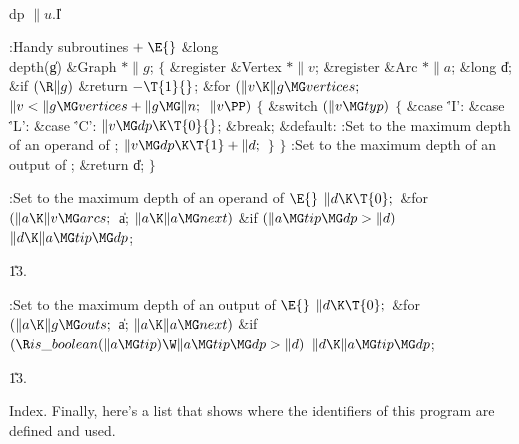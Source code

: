 \Y\B\4\D\\{dp}\5
$\|u.{}$\|I\par
\Y\B\4:Handy subroutines\X${}\mathrel+\E{}$\6
\1\1\&{long} \\{depth}(\|g)\6
\&{Graph} ${}{*}\|g{}$;\2\2\6
${}\{{}$\5
\1\&{register} \&{Vertex} ${}{*}\|v{}$;\6
\&{register} \&{Arc} ${}{*}\|a{}$;\6
\&{long} \|d;\7
\&{if} ${}(\R\|g){}$\1\5
\&{return} ${}{-}\T{1}{}$;\2\6
\&{for} ${}(\|v\K\|g\MG\\{vertices};{}$ ${}\|v<\|g\MG\\{vertices}+\|g\MG\|n;{}$
${}\|v\PP){}$\5
${}\{{}$\1\6
\&{switch} ${}(\|v\MG\\{typ}){}$\5
${}\{{}$\1\6
\4\&{case} \.{'I'}:\5
\&{case} \.{'L'}:\5
\&{case} \.{'C'}:\5
${}\|v\MG\\{dp}\K\T{0}{}$;\5
\&{break};\6
\4\&{default}:\5
:Set  to the maximum depth of an operand of \X;\6
${}\|v\MG\\{dp}\K\T{1}+\|d;{}$\6
\4${}\}{}$\2\6
\4${}\}{}$\2\6
:Set  to the maximum depth of an output of \X;\6
\&{return} \|d;\6
\4${}\}{}$\2\par
\fi

\B{}:Set  to the maximum depth of an operand of \X${}%
\E{}$\6
$\|d\K\T{0};{}$\6
\&{for} ${}(\|a\K\|v\MG\\{arcs};{}$ \|a; ${}\|a\K\|a\MG\\{next}){}$\1\6
\&{if} ${}(\|a\MG\\{tip}\MG\\{dp}>\|d){}$\1\5
${}\|d\K\|a\MG\\{tip}\MG\\{dp}{}$;\2\2\par
\U13.\fi

\B{}:Set  to the maximum depth of an output of \X${}%
\E{}$\6
$\|d\K\T{0};{}$\6
\&{for} ${}(\|a\K\|g\MG\\{outs};{}$ \|a; ${}\|a\K\|a\MG\\{next}){}$\1\6
\&{if} ${}(\R\\{is\_boolean}(\|a\MG\\{tip})\W\|a\MG\\{tip}\MG\\{dp}>\|d){}$\1\5
${}\|d\K\|a\MG\\{tip}\MG\\{dp}{}$;\2\2\par
\U13.\fi

Index. Finally, here's a list that shows where the identifiers of this
program are defined and used.
\fi

\inx
\fin
\con
